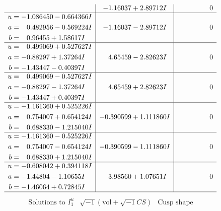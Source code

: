 \documentclass[1p]{elsarticle_modified}
\theoremstyle{definition}
\newcommand{\I}{\sqrt{-1}}
\begin{document}
$$\begin{array}{c|c|c}
 & -1.16037 + 2.89712 I & \phantom{-0.000000 } 0 \\ \hline\begin{aligned}
u &= -1.086450 - 0.664366 I \\
a &= \phantom{-}0.482956 - 0.569224 I \\
b &= \phantom{-}0.96455 + 1.58617 I\end{aligned}
 & -1.16037 - 2.89712 I & \phantom{-0.000000 } 0 \\ \hline\begin{aligned}
u &= \phantom{-}0.499069 + 0.527627 I \\
a &= -0.88297 + 1.37264 I \\
b &= -1.43447 - 0.40397 I\end{aligned}
 & \phantom{-}4.65459 - 2.82623 I & \phantom{-0.000000 } 0 \\ \hline\begin{aligned}
u &= \phantom{-}0.499069 - 0.527627 I \\
a &= -0.88297 - 1.37264 I \\
b &= -1.43447 + 0.40397 I\end{aligned}
 & \phantom{-}4.65459 + 2.82623 I & \phantom{-0.000000 } 0 \\ \hline\begin{aligned}
u &= -1.161360 + 0.525226 I \\
a &= \phantom{-}0.754007 + 0.654124 I \\
b &= \phantom{-}0.688330 - 1.215040 I\end{aligned}
 & -0.390599 + 1.111860 I & \phantom{-0.000000 } 0 \\ \hline\begin{aligned}
u &= -1.161360 - 0.525226 I \\
a &= \phantom{-}0.754007 - 0.654124 I \\
b &= \phantom{-}0.688330 + 1.215040 I\end{aligned}
 & -0.390599 - 1.111860 I & \phantom{-0.000000 } 0 \\ \hline\begin{aligned}
u &= -0.608042 + 0.394118 I \\
a &= -1.44804 - 1.10655 I \\
b &= -1.46064 + 0.72845 I\end{aligned}
 & \phantom{-}3.98560 + 1.07651 I & \phantom{-0.000000 } 0\\
 \hline 
 \end{array}$$\newpage$$\begin{array}{c|c|c}  
\text{Solutions to }I^u_{1}& \I (\text{vol} + \sqrt{-1}CS) & \text{Cusp shape}\\

\end{array}$$
\end{document}
